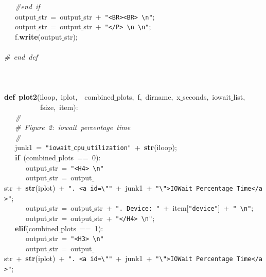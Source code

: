 \mbox{}\ \ \ \textit{\#end\ if} \\
\mbox{}\ \ \ output$\_$str\ =\ output$\_$str\ +\ \texttt{"{}\textless{}BR\textgreater{}\textless{}BR\textgreater{}\ \textbackslash{}n"{}}; \\
\mbox{}\ \ \ output$\_$str\ =\ output$\_$str\ +\ \texttt{"{}\textless{}/P\textgreater{}\ \textbackslash{}n\ \textbackslash{}n"{}}; \\
\mbox{}\ \ \ f.\textbf{write}(output$\_$str); \\
\mbox{}\ \ \  \\
\mbox{}\textit{\#\ end\ def} \\
\mbox{} \\
\mbox{} \\
\mbox{} \\
\mbox{}\textbf{def}\ \textbf{plot2}(iloop,\ iplot,\ \ combined$\_$plots,\ f,\ dirname,\ x$\_$seconds,\ iowait$\_$list,\  \\
\mbox{}\ \ \ \ \ \ \ \ \ \ fsize,\ item): \\
\mbox{}\ \ \ \textit{\#} \\
\mbox{}\ \ \ \textit{\#\ Figure\ 2:\ iowait\ percentage\ time} \\
\mbox{}\ \ \ \textit{\#} \\
\mbox{}\ \ \ junk1\ =\ \texttt{"{}iowait$\_$cpu$\_$utilization"{}}\ +\ \textbf{str}(iloop); \\
\mbox{}\ \ \ \textbf{if}\ (combined$\_$plots\ ==\ 0): \\
\mbox{}\ \ \ \ \ \ output$\_$str\ =\ \texttt{"{}\textless{}H4\textgreater{}\ \textbackslash{}n"{}} \\
\mbox{}\ \ \ \ \ \ output$\_$str\ =\ output$\_$str\ +\ \textbf{str}(iplot)\ +\ \texttt{"{}.\ \textless{}a\ id=\textbackslash{}"{}"{}}\ +\ junk1\ +\ \texttt{"{}\textbackslash{}"{}\textgreater{}IOWait\ Percentage\ Time\textless{}/a\textgreater{}"{}}; \\
\mbox{}\ \ \ \ \ \ output$\_$str\ =\ output$\_$str\ +\ \texttt{"{}.\ Device:\ "{}}\ +\ item[\texttt{"{}device"{}}]\ +\ \texttt{"{}\ \textbackslash{}n"{}}; \\
\mbox{}\ \ \ \ \ \ output$\_$str\ =\ output$\_$str\ +\ \texttt{"{}\textless{}/H4\textgreater{}\ \textbackslash{}n"{}}; \\
\mbox{}\ \ \ \textbf{elif}(combined$\_$plots\ ==\ 1): \\
\mbox{}\ \ \ \ \ \ output$\_$str\ =\ \texttt{"{}\textless{}H3\textgreater{}\ \textbackslash{}n"{}} \\
\mbox{}\ \ \ \ \ \ output$\_$str\ =\ output$\_$str\ +\ \textbf{str}(iplot)\ +\ \texttt{"{}.\ \textless{}a\ id=\textbackslash{}"{}"{}}\ +\ junk1\ +\ \texttt{"{}\textbackslash{}"{}\textgreater{}IOWait\ Percentage\ Time\textless{}/a\textgreater{}"{}}; \\
